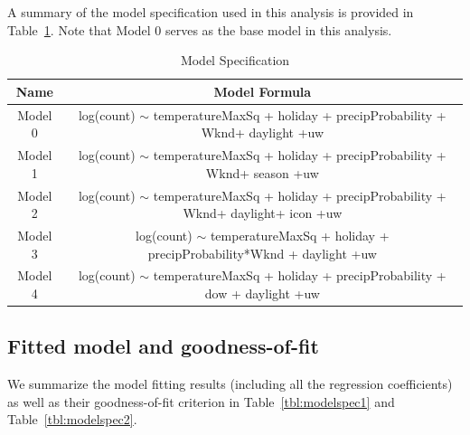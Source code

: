 \documentclass [11pt, proquest] {uwthesis}[2015/03/03]
\begin{document}
A summary of the model specification used in this analysis is provided in Table~\ref{tbl:model_spec}. Note that Model 0 serves as the base model in this analysis. 

\begin{table}
 \centering 
\caption{Model Specification} 
  \label{tbl:model_spec} 
\begin{tabular}{| c || c |} 
\hline 
  Name & Model Formula \\ 
\hline
  Model 0 & log(count) $\sim$ temperatureMaxSq  + holiday + precipProbability  + Wknd+ daylight +uw  \\ 
  Model 1 & log(count) $\sim$ temperatureMaxSq  + holiday +  precipProbability  + Wknd+ season +uw \\ 
  Model 2 & log(count) $\sim$ temperatureMaxSq  + holiday +  precipProbability  + Wknd+ daylight+ icon +uw\\ 
  Model 3 & log(count) $\sim$ temperatureMaxSq  + holiday +   precipProbability*Wknd + daylight +uw\\ 
  Model 4 &  log(count) $\sim$ temperatureMaxSq  + holiday +  precipProbability  + dow + daylight +uw\\ 
\hline 
\end{tabular} 
\end{table} 

\subsection{Fitted model and goodness-of-fit}
We summarize the model fitting results (including all the regression coefficients) as well as their goodness-of-fit criterion in Table~\ref{tbl:modelspec1} and Table~\ref{tbl:modelspec2}.
\end{document}
